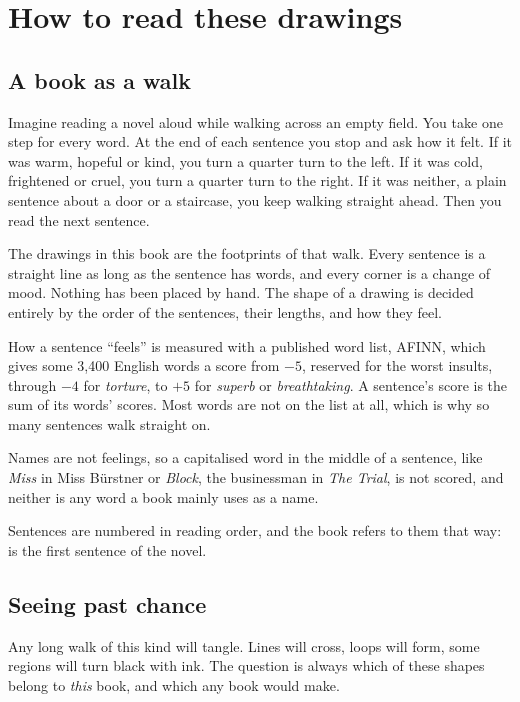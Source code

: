 \chapter{How to read these drawings}
\label{ch:method}

\section{A book as a walk}

Imagine reading a novel aloud while walking across an empty field. You take one
step for every word. At the end of each sentence you stop and ask how it felt.
If it was warm, hopeful or kind, you turn a quarter turn to the left. If it was
cold, frightened or cruel, you turn a quarter turn to the right. If it was
neither, a plain sentence about a door or a staircase, you keep walking
straight ahead. Then you read the next sentence.

The drawings in this book are the footprints of that walk. Every sentence is a
straight line as long as the sentence has words, and every corner is a change
of mood. Nothing has been placed by hand. The shape of a drawing is decided
entirely by the order of the sentences, their lengths, and how they feel.

How a sentence ``feels'' is measured with a published word list, AFINN, which
gives some 3,400 English words a score from $-5$, reserved for the worst
insults, through $-4$ for \emph{torture}, to $+5$ for \emph{superb} or
\emph{breathtaking}. A sentence's score is the sum of its words' scores. Most words
are not on the list at all, which is why so many sentences walk straight on.

Names are not feelings, so a capitalised word in the middle of a sentence, like
\emph{Miss} in Miss Bürstner or \emph{Block}, the businessman in \emph{The
Trial}, is not scored, and neither is any word a book mainly uses as a name.

Sentences are numbered in reading order, and the book refers to them that way:
 is the first sentence of the novel.

\section{Seeing past chance}

Any long walk of this kind will tangle. Lines will cross, loops will form,
some regions will turn black with ink. The question is always which of these
shapes belong to \emph{this} book, and which any book would make.

